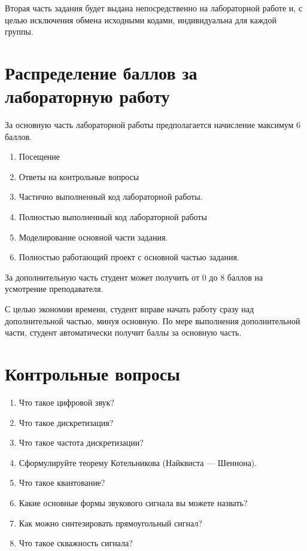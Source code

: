 Вторая часть задания будет выдана непосредственно на лабораторной работе и, с целью исключения обмена исходными кодами, индивидуальна для каждой группы.

\section{Распределение баллов за лабораторную работу}

За основную часть лабораторной работы предполагается начисление максимум 6 баллов.

\begin{enumerate}
\item Посещение
\item Ответы на контрольные вопросы
\item Частично выполненный код лабораторной работы.
\item Полностью выполненный код лабораторной работы
\item Моделирование основной части задания.
\item Полностью работающий проект с основной частью задания.

\end{enumerate}

За дополнительную часть студент может получить от 0 до 8 баллов на усмотрение преподавателя.

С целью экономии времени, студент вправе начать работу сразу над дополнительной частью, минуя основную. По мере выполнения дополнительной части, студент автоматически получит баллы за основную часть.

\section{Контрольные вопросы}

\begin{enumerate}
\item Что такое цифровой звук?
\item Что такое дискретизация?
\item Что такое частота дискретизации?
\item Сформулируйте теорему Котельникова (Найквиста — Шеннона).
\item Что такое квантование?
\item Какие основные формы звукового сигнала вы можете назвать?
\item Как можно синтезировать прямоугольный сигнал?
\item Что такое скважность сигнала?
\end{enumerate}
